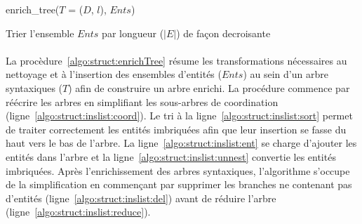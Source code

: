 \begin{procedure}[htb]
    \caption{enrich\_tree($T$ = ($D$, $l$), $Ents$)}
    \label{algo:struct:enrichTree}



    Trier l'ensemble $Ents$ par longueur ($|E|$) de façon decroisante\label{algo:struct:inslist:sort}\;

\end{procedure}

\paragraph{}
La procèdure~\ref{algo:struct:enrichTree} résume les transformations nécessaires au nettoyage et à l'insertion des ensembles d'entités ($Ents$) au sein d'un arbre syntaxiques ($T$) afin de construire un arbre enrichi.
La procédure commence par réécrire les arbres en simplifiant les sous-arbres de coordination (ligne~\ref{algo:struct:inslist:coord}).
Le tri à la ligne~\ref{algo:struct:inslist:sort} permet de traiter correctement les entités imbriquées afin que leur insertion se fasse du haut vers le bas de l'arbre.
La ligne~\ref{algo:struct:inslist:ent} se charge d'ajouter les entités dans l'arbre et la ligne~\ref{algo:struct:inslist:unnest} convertie les entités imbriquées.
Après l'enrichissement des arbres syntaxiques, l'algorithme s'occupe de la simplification en commençant par supprimer les branches ne contenant pas d'entités (ligne~\ref{algo:struct:inslist:del}) avant de réduire l'arbre (ligne~\ref{algo:struct:inslist:reduce}).

